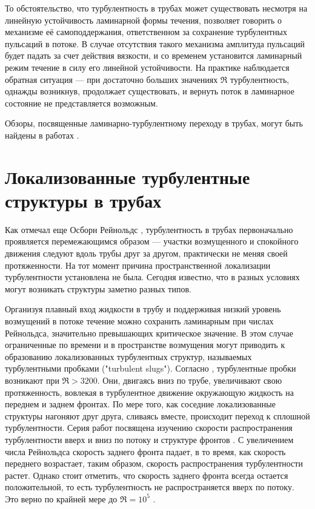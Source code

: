 То обстоятельство, что турбулентность в трубах может существовать несмотря на линейную устойчивость ламинарной формы течения, позволяет говорить о механизме её самоподдержания, ответственном за сохранение турбулентных пульсаций в потоке. В случае отсутствия такого механизма амплитуда пульсаций будет падать за счет действия вязкости, и со временем установится ламинарный режим течение в силу его линейной устойчивости. На практике наблюдается обратная ситуация --- при достаточно больших значениях $\Re$ турбулентность, однажды возникнув, продолжает существовать, и вернуть поток в ламинарное состояние не представляется возможным. 

Обзоры, посвященные ламинарно-турбулентному переходу в трубах, могут быть найдены в работах \cite{Kerswell2005, Eckhardt2007, Manneville2015, Manneville2016, Kreilos2014, Barkley2016}.



\section{Локализованные турбулентные структуры в трубах} \label{local_structures}

Как отмечал еще Осборн Рейнольдс \cite{Reynolds1883}, турбулентность в трубах первоначально проявляется перемежающимся образом --- участки возмущенного и спокойного движения следуют вдоль трубы друг за другом, практически не меняя своей протяженности. На тот момент причина пространственной локализации турбулентности установлена не была. Сегодня известно, что в разных условиях могут возникать структуры заметно разных типов. 

Организуя плавный вход жидкости в трубу и поддерживая низкий уровень возмущений в потоке течение можно сохранить ламинарным при числах Рейнольдса, значительно превышающих критическое значение. В этом случае ограниченные по времени и в пространстве возмущения могут приводить к образованию локализованных турбулентных структур, называемых турбулентными пробками ("turbulent slugs"). Согласно \cite{Wygnanski1973}, турбулентные пробки возникают при $\Re > 3200$. Они, двигаясь вниз по трубе, увеличивают свою протяженность, вовлекая в турбулентное движение окружающую жидкость на переднем и заднем фронтах. По мере того, как соседние локализованные структуры нагоняют друг друга, сливаясь вместе, происходит переход к сплошной турбулентности. Серия работ посвящена изучению скорости распространения турбулентности вверх и вниз по потоку и структуре фронтов \cite{Lindgren1969, Wygnanski1973, Nishi2008, Duguet2010, Barkley2015}. С увеличением числа Рейнольдса скорость заднего фронта падает, в то время, как скорость переднего возрастает, таким образом, скорость распространения турбулентности растет. Однако стоит отметить, что скорость заднего фронта всегда остается положительной, то есть турбулентность не распространяется вверх по потоку. Это верно по крайней мере до $\Re = 10^5$ \cite{Wygnanski1973}. 

